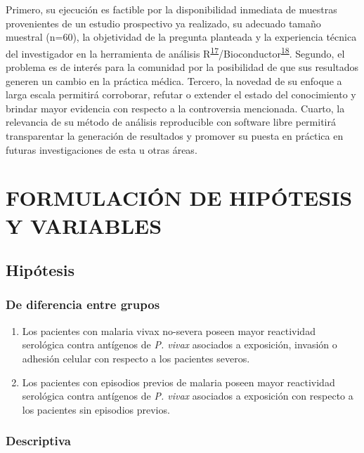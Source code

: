\documentclass[]{article}
\begin{document}
Primero, su ejecución es factible por la disponibilidad inmediata de
muestras provenientes de un estudio prospectivo ya realizado, su
adecuado tamaño muestral (n=60), la objetividad de la pregunta planteada
y la experiencia técnica del investigador en la herramienta de análisis
R\textsuperscript{\protect\hyperlink{ref-R2016}{17}}/Bioconductor\textsuperscript{\protect\hyperlink{ref-bioconductor2004}{18}}.
Segundo, el problema es de interés para la comunidad por la posibilidad
de que sus resultados generen un cambio en la práctica médica. Tercero,
la novedad de su enfoque a larga escala permitirá corroborar, refutar o
extender el estado del conocimiento y brindar mayor evidencia con
respecto a la controversia mencionada. Cuarto, la relevancia de su
método de análisis reproducible con software libre permitirá
transparentar la generación de resultados y promover su puesta en
práctica en futuras investigaciones de esta u otras áreas.

\section{FORMULACIÓN DE HIPÓTESIS Y
VARIABLES}\label{formulacion-de-hipotesis-y-variables}

\subsection{Hipótesis}\label{hipotesis}

\subsubsection{De diferencia entre
grupos}\label{de-diferencia-entre-grupos}

\begin{enumerate}
\def\labelenumi{\arabic{enumi}.}
\item
  Los pacientes con malaria vivax no-severa poseen mayor reactividad
  serológica contra antígenos de \emph{P. vivax} asociados a exposición,
  invasión o adhesión celular con respecto a los pacientes severos.
\item
  Los pacientes con episodios previos de malaria poseen mayor
  reactividad serológica contra antígenos de \emph{P. vivax} asociados a
  exposición con respecto a los pacientes sin episodios previos.
\end{enumerate}

\subsubsection{Descriptiva}\label{descriptiva}
\end{document}
